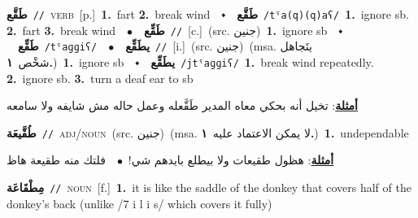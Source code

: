 \documentclass[10pt,a4paper,twoside]{article} %
\begin{document}
\begin{multicols}{2}
{\setlength\topsep{0pt}\textbf{\foreignlanguage{arabic}{طَقَّع}}\ {\color{gray}\texttt{//}\color{black}}\ \textsc{verb}\ [p.]\ \textbf{1.}~fart  \textbf{2.}~break wind\ \ $\smblkdiamond$\ \ \setlength\topsep{0pt}\textbf{\foreignlanguage{arabic}{طَقَّع}}\ {\color{gray}\texttt{/tˤa(q)(q)aʕ/}\color{black}}\ \textbf{1.}~ignore sb.  \textbf{2.}~fart  \textbf{3.}~break wind\ \ $\bullet$\ \ \setlength\topsep{0pt}\textbf{\foreignlanguage{arabic}{طَقِّع}}\ {\color{gray}\texttt{//}\color{black}}\ [c.]\ (src. \color{gray}\foreignlanguage{arabic}{جنين}\color{black})\ \textbf{1.}~ignore sb\ \ $\smblkdiamond$\ \ \setlength\topsep{0pt}\textbf{\foreignlanguage{arabic}{طَقِّع}}\ {\color{gray}\texttt{/tˤaɡɡiʕ/}\color{black}}\ \ $\bullet$\ \ \setlength\topsep{0pt}\textbf{\foreignlanguage{arabic}{يطَقِّع}}\ {\color{gray}\texttt{//}\color{black}}\ [i.]\ (src. \color{gray}\foreignlanguage{arabic}{جنين}\color{black})\ \color{gray}(msa. \foreignlanguage{arabic}{يتَجاهل شخْص}~\foreignlanguage{arabic}{\textbf{١.}})\color{black}\ \textbf{1.}~ignore sb\ \ $\smblkdiamond$\ \ \setlength\topsep{0pt}\textbf{\foreignlanguage{arabic}{يطَقِّع}}\ {\color{gray}\texttt{/jtˤaɡɡiʕ/}\color{black}}\ \textbf{1.}~break wind repeatedly.  \textbf{2.}~ignore sb.  \textbf{3.}~turn a deaf ear to sb\  \begin{flushright}\color{gray}\foreignlanguage{arabic}{\textbf{\underline{\foreignlanguage{arabic}{أمثلة}}}: تخيل أنه بحكي معاه المدير طَقَّعله وعمل حاله مش شايفه ولا سامعه}\end{flushright}\color{black}} \vspace{2mm}

{\setlength\topsep{0pt}\textbf{\foreignlanguage{arabic}{طُقَّيعَة}}\ {\color{gray}\texttt{//}\color{black}}\ \textsc{adj/noun}\ (src. \color{gray}\foreignlanguage{arabic}{جنين}\color{black})\ \color{gray}(msa. \foreignlanguage{arabic}{لا يمكن الاعتماد عليه}~\foreignlanguage{arabic}{\textbf{١.}})\color{black}\ \textbf{1.}~undependable\  \begin{flushright}\color{gray}\foreignlanguage{arabic}{\textbf{\underline{\foreignlanguage{arabic}{أمثلة}}}: هظول طقيعات ولا بيطلع بايدهم شي!\ $\bullet$\ \  فلتك منه طقيعة هاظ}\end{flushright}\color{black}} \vspace{2mm}

{\setlength\topsep{0pt}\textbf{\foreignlanguage{arabic}{مِطْقَاعَة}}\ {\color{gray}\texttt{//}\color{black}}\ \textsc{noun}\ [f.]\ \textbf{1.}~it is like the saddle of the donkey that covers half of the donkey's back (unlike /7 i l i s/ which covers it fully)\ } \vspace{2mm}


\end{multicols}
\end{document}

